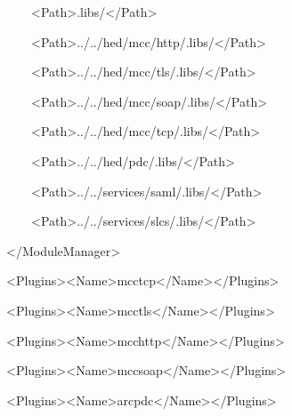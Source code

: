 \documentclass{article}
\begin{document}
{\ttfamily\color{black}
\ \ \ \ \ \ \ \ {\textless}Path{\textgreater}.libs/{\textless}/Path{\textgreater}
}

{\ttfamily\color{black}
\ \ \ \ \ \ \ \ {\textless}Path{\textgreater}../../hed/mcc/http/.libs/{\textless}/Path{\textgreater}
}

{\ttfamily\color{black}
\ \ \ \ \ \ \ \ {\textless}Path{\textgreater}../../hed/mcc/tls/.libs/{\textless}/Path{\textgreater}
}

{\ttfamily\color{black}
\ \ \ \ \ \ \ \ {\textless}Path{\textgreater}../../hed/mcc/soap/.libs/{\textless}/Path{\textgreater}
}

{\ttfamily\color{black}
\ \ \ \ \ \ \ \ {\textless}Path{\textgreater}../../hed/mcc/tcp/.libs/{\textless}/Path{\textgreater}
}

{\ttfamily\color{black}
\ \ \ \ \ \ \ \ {\textless}Path{\textgreater}../../hed/pdc/.libs/{\textless}/Path{\textgreater}
}

{\ttfamily\color{black}
\ \ \ \ \ \ \ \ {\textless}Path{\textgreater}../../services/saml/.libs/{\textless}/Path{\textgreater}
}

{\ttfamily\color{black}
\ \ \ \ \ \ \ \ {\textless}Path{\textgreater}../../services/slcs/.libs/{\textless}/Path{\textgreater}
}

{\ttfamily\color{black}
\ \ \ \ {\textless}/ModuleManager{\textgreater} }

{\ttfamily\color{black}
\ \ \ \ {\textless}Plugins{\textgreater}{\textless}Name{\textgreater}mcctcp{\textless}/Name{\textgreater}{\textless}/Plugins{\textgreater}
}

{\ttfamily\color{black}
\ \ \ \ {\textless}Plugins{\textgreater}{\textless}Name{\textgreater}mcctls{\textless}/Name{\textgreater}{\textless}/Plugins{\textgreater}
}

{\ttfamily\color{black}
\ \ \ \ {\textless}Plugins{\textgreater}{\textless}Name{\textgreater}mcchttp{\textless}/Name{\textgreater}{\textless}/Plugins{\textgreater}
}

{\ttfamily\color{black}
\ \ \ \ {\textless}Plugins{\textgreater}{\textless}Name{\textgreater}mccsoap{\textless}/Name{\textgreater}{\textless}/Plugins{\textgreater}
}

{\ttfamily\color{black}
\ \ \ \ {\textless}Plugins{\textgreater}{\textless}Name{\textgreater}arcpdc{\textless}/Name{\textgreater}{\textless}/Plugins{\textgreater}
}
\end{document}
